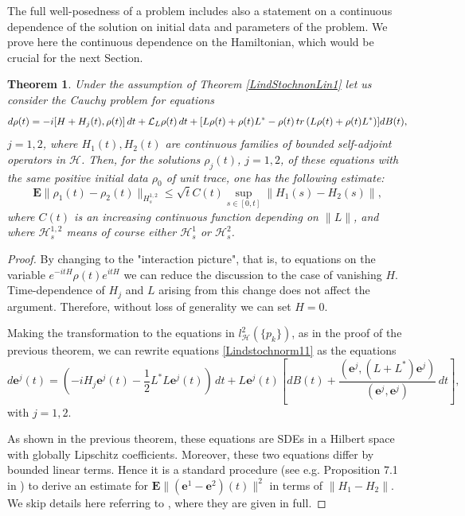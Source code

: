 \documentclass[10pt,a4paper]{amsart}
\def\LC{\mathcal{L}}
\def\HC{\mathcal{H}}
\def\E{\mathbf{E}}
\def\e{\mathbf{e}}
\def\tr{\rm{tr}}
\newtheorem{theorem}{Theorem}[section]
\begin{document}
The full well-posedness of a problem includes also a statement on a continuous dependence of
the solution on initial data and parameters of the problem. We prove here the continuous dependence
on the Hamiltonian, which would be crucial for the next Section.

 \begin{theorem}
\label{LindStochnonLin2}
Under the assumption of Theorem \ref{LindStochnonLin1}
let us consider the Cauchy problem for equations
\begin{equation}
\label{Lindstochnorm11}
d\rho(t)=-i[H+H_j(t),\rho(t)]\, dt+\LC_L \rho (t)\, dt
+[L\rho(t)+\rho(t) L^*-\rho(t)\, {\tr} \, (L\rho(t)+\rho(t) L^*) ] dB(t),
\end{equation}
$j=1,2$, where $H_1(t), H_2(t)$ are continuous families of bounded self-adjoint
 operators in $\HC$.
Then, for the solutions $\rho_j(t)$, $j=1,2$, of these equations with the same
positive initial data $\rho_0$ of unit trace, one has the following estimate:
\begin{equation}
\label{Lindstochnorm12}
\E \|\rho_1(t)-\rho_2(t)\|_{H^{1,2}_s} \le \sqrt t C(t) \sup_{s\in [0,t]}\|H_1(s)-H_2(s)\|,
\end{equation}
where $C(t)$ is an increasing continuous function depending on $\|L\|$,
and where $\HC^{1,2}_s$ means of course either $\HC^1_s$ or $\HC^2_s$.
\end{theorem}

\begin{proof} By changing to the "interaction picture", that is, to equations
on the variable $e^{-itH}\rho(t) e^{itH}$ we can reduce the discussion to the case
of vanishing $H$. Time-dependence of $H_j$ and $L$ arising from this change does
not affect the argument. Therefore, without loss of generality we can set $H=0$.

Making the transformation to the equations in $l^2_{\HC}(\{p_k\})$,
as in the proof of the previous theorem,
 we can rewrite equations \eqref{Lindstochnorm11} as the equations
\begin{equation}
\label{eqinfdim11}
d \e^j(t)=(-iH_j \e^j(t)-\frac12 L^*L \e^j(t))\, dt +L\e^j(t)
\left[dB(t)+\frac{(\e^j, (L+L^*) \e^j)}{(\e^j, \e^j)} \, dt\right],
\end{equation}
with $j=1,2$.

As shown in the previous theorem, these equations are SDEs in a Hilbert space
with globally Lipschitz coefficients. Moreover, these two equations differ by
bounded linear terms. Hence it is a standard procedure
(see e.g. Proposition 7.1 in \cite{KolQuantLLN}) to derive an
estimate for $\E \|(\e^1-\e^2)(t)\|^2$ in terms of $\|H_1-H_2\|$.
We skip details here referring to \cite{Kol25a}, where they are given in full.
\end{proof}
\end{document}
